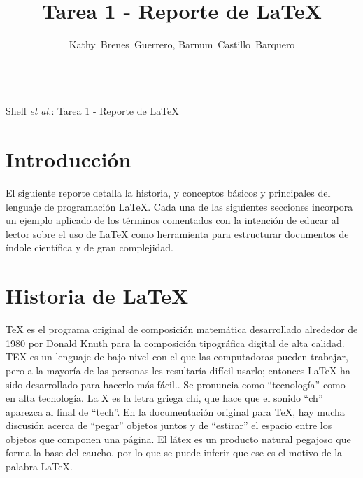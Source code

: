 \documentclass[letterpaper, 10pt, journal]{IEEEtran}
\begin{document}
\title{Tarea 1 - Reporte de \LaTeX{}  }
\author{Kathy~Brenes~Guerrero, Barnum~Castillo~Barquero

~}%

%
{Shell \MakeLowercase{\textit{et al.}}: Tarea 1 - Reporte de \LaTeX{}  }
\maketitle

\section{Introducci\'on}
El siguiente reporte detalla la historia, y conceptos b\'asicos y principales del lenguaje de programaci\'on \LaTeX{}. Cada una de las siguientes secciones incorpora un ejemplo aplicado de los t\'erminos comentados con la intenci\'on de educar al lector sobre el uso de \LaTeX{} como herramienta para estructurar documentos de \'indole cient\'ifica y de gran complejidad.

\section{Historia de \LaTeX{}  }
TeX es el programa original de composici\'on matem\'atica desarrollado alrededor de 1980 por Donald Knuth  para la composici\'on tipogr\'afica digital de alta calidad.\cite{[3]} TEX es un lenguaje de bajo nivel con el que las computadoras pueden trabajar, pero a la mayor\'ia de las personas les resultar\'ia dif\'icil usarlo; entonces \LaTeX{} ha sido desarrollado para hacerlo m\'as f\'acil.\cite{[2]}. Se pronuncia como \textquotedblleft{}tecnolog\'{i}a\textquotedblright{} como en alta tecnolog\'ia. La X es la letra griega chi, que hace que el sonido \textquotedblleft{}ch\textquotedblright{} aparezca al final de \textquotedblleft{}tech\textquotedblright{}. En la documentaci\'on original para TeX, hay mucha discusi\'on acerca de \textquotedblleft{}pegar\textquotedblright{} objetos juntos y de \textquotedblleft{}estirar\textquotedblright{} el espacio entre los objetos que componen una p\'agina. \cite{[3]} El l\'{a}tex es un producto natural pegajoso que forma la base del caucho, por lo que se puede inferir que ese es el motivo de la palabra \LaTeX{}. 
\end{document}
